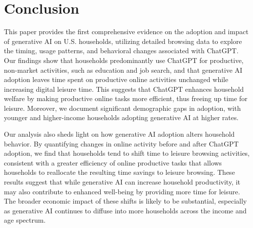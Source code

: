 \documentclass[12pt]{article}
\begin{document}


\section{Conclusion} \label{sec:conclusion}

This paper provides the first comprehensive evidence on the adoption and impact of generative AI on U.S. households, utilizing detailed browsing data to explore the timing, usage patterns, and behavioral changes associated with ChatGPT. Our findings show that households predominantly use ChatGPT for productive, non-market activities, such as education and job search, and that generative AI adoption leaves time spent on productive online activities unchanged while increasing digital leisure time. This suggests that ChatGPT enhances household welfare by making productive online tasks more efficient, thus freeing up time for leisure. Moreover, we document significant demographic gaps in adoption, with younger and higher-income households adopting generative AI at higher rates. 

Our analysis also sheds light on how generative AI adoption alters household behavior. By quantifying changes in online activity before and after ChatGPT adoption, we find that households tend to shift time to leisure browsing activities, consistent with a greater efficiency of online productive tasks that allows households to reallocate the resulting time savings to leisure browsing. These results suggest that while generative AI can increase household productivity, it may also contribute to enhanced well-being by providing more time for leisure. The broader economic impact of these shifts is likely to be substantial, especially as generative AI continues to diffuse into more households across the income and age spectrum.
\end{document}
